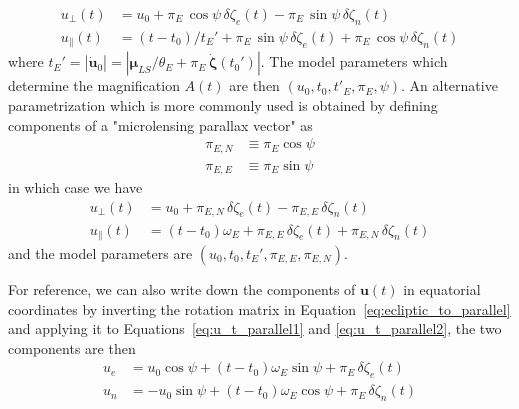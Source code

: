 \documentclass[11pt]{report}
\begin{document}
\begin{align}
    u_\bot(t)      & = u_0 + \pi_E\,\cos\psi\,\delta \zeta_e(t) - \pi_E\,\sin\psi\,\delta \zeta_n(t)
    \label{eq:u_t_parallel1}                                                                         \\
    u_\parallel(t) & =(t-t_0)/t_E' + \pi_E\,\sin\psi\,\delta \zeta_e(t) +
    \pi_E\,\cos\psi\,\delta \zeta_n(t) \label{eq:u_t_parallel2}
\end{align}
where $t_E' =|\dot{\mathbf{u}}_0|=|\boldsymbol\mu_{LS}/\theta_E  + \pi_E\,\dot{\boldsymbol \zeta}(t_0')|$.
The model parameters which determine the magnification $A(t)$ are then
$\left(u_0,t_0,t'_E,\pi_E,\psi\right)$.
An alternative parametrization which is more commonly used is obtained by
defining components of a "microlensing parallax vector" as
\begin{align}
    \pi_{E,N} & \equiv \pi_E\cos\psi \\
    \pi_{E,E} & \equiv \pi_E\sin\psi
\end{align}
in which case we have
\begin{align}
    u_\bot(t)      & = u_0 + \pi_{E,N}\,\delta \zeta_e(t) - \pi_{E,E}\,\delta \zeta_n(t) \\
    u_\parallel(t) & =(t-t_0)\omega_E + \pi_{E,E}\,\delta\zeta_e(t) +
    \pi_{E,N}\,\delta\zeta_n(t)
\end{align}
and the model parameters are $\left(u_0,t_0,t_E',\pi_{E,E},\pi_{E,N}\right)$.

For reference, we can also write down the components of $\mathbf{u}(t)$ in
equatorial coordinates by inverting the rotation matrix in
Equation~\ref{eq:ecliptic_to_parallel} and applying it to
Equations~\ref{eq:u_t_parallel1} and \ref{eq:u_t_parallel2}, the two components
are then
\begin{align}
    u_e & =u_0\cos\psi + (t-t_0)\omega_E\sin\psi + \pi_E\,\delta\zeta_e(t)  \\
    u_n & =-u_0\sin\psi + (t-t_0)\omega_E\cos\psi + \pi_E\,\delta\zeta_n(t)
\end{align}
\end{document}
